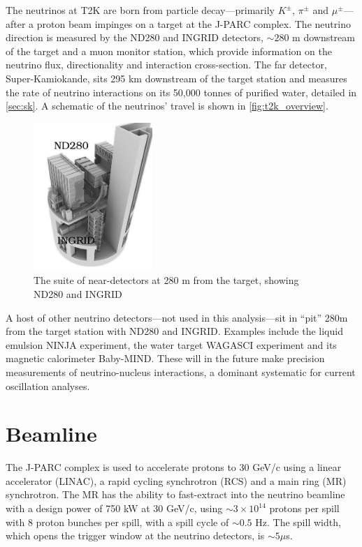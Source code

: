 The neutrinos at T2K are born from particle decay---primarily $K^\pm$, $\pi^\pm$ and $\mu^\pm$---after a proton beam impinges on a target at the J-PARC complex. The neutrino direction is measured by the ND280 and INGRID detectors, $\sim280$ m downstream of the target and a muon monitor station, which provide information on the neutrino flux, directionality and interaction cross-section. The far detector, Super-Kamiokande, sits 295 km downstream of the target station and measures the rate of neutrino interactions on its 50,000 tonnes of purified water, detailed in \autoref{sec:sk}. A schematic of the neutrinos' travel is shown in \autoref{fig:t2k_overview}.
\begin{figure}[h]
	\includegraphics[width=0.4\textwidth, trim={10mm 0mm 0mm 0mm}, clip,page=1]{figures/det_chap/view/image_nd.jpeg}
	\caption{The suite of near-detectors at 280 m from the target, showing ND280 and INGRID}
\end{figure}

A host of other neutrino detectors---not used in this analysis---sit in ``pit'' 280m from the target station with ND280 and INGRID. Examples include the liquid emulsion NINJA experiment\cite{ninja}, the water target WAGASCI\cite{wagasci} experiment and its magnetic calorimeter Baby-MIND\cite{baby_mind}. These will in the future make precision measurements of neutrino-nucleus interactions, a dominant systematic for current oscillation analyses.

\section{Beamline}
The J-PARC complex\cite{jparc_tdr} is used to accelerate protons to 30 GeV/c using a linear accelerator (LINAC), a rapid cycling synchrotron (RCS) and a main ring (MR) synchrotron. The MR has the ability to fast-extract into the neutrino beamline with a design power of 750 kW at 30 GeV/c, using $\sim3\times10^{14}$ protons per spill with 8 proton bunches per spill, with a spill cycle of $\sim0.5$ Hz. The spill width, which opens the trigger window at the neutrino detectors, is $\sim5 \mu$s\cite{t2k_det}.

